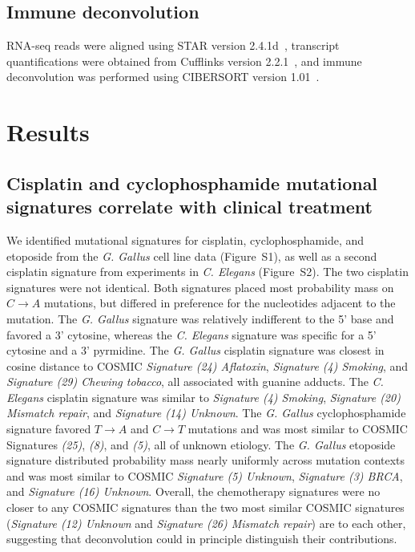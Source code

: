 \documentclass[linenumbers]{bmcart}
\begin{document}
\subsection*{Immune deconvolution}
RNA-seq reads were aligned using STAR version 2.4.1d~\cite{dobin2013}, transcript quantifications were obtained from Cufflinks version 2.2.1~\cite{trapnell2010}, and immune deconvolution was performed using CIBERSORT version 1.01~\cite{newman2015}. 


\section*{Results}

\subsection*{Cisplatin and cyclophosphamide mutational signatures correlate with clinical treatment}

We identified mutational signatures for cisplatin, cyclophosphamide, and etoposide from the \textit{G. Gallus} cell line data (Figure~S1), as well as a second cisplatin signature from experiments in \textit{C. Elegans} (Figure~S2). The two cisplatin signatures were not identical. Both signatures placed most probability mass on $C \rightarrow A$ mutations, but differed in preference for the nucleotides adjacent to the mutation. The \textit{G. Gallus} signature was relatively indifferent to the 5' base and favored a 3' cytosine, whereas the \textit{C. Elegans} signature was specific for a 5' cytosine and a 3' pyrmidine. The \textit{G. Gallus} cisplatin signature was closest in cosine distance to COSMIC \textit{Signature (24) Aflatoxin}, \textit{Signature (4) Smoking}, and \textit{Signature (29) Chewing tobacco}, all associated with guanine adducts. The \textit{C. Elegans} cisplatin signature was similar to \textit{Signature (4) Smoking}, \textit{Signature (20) Mismatch repair}, and \textit{Signature (14) Unknown}. The \textit{G. Gallus} cyclophosphamide signature favored $T \rightarrow A$ and $C \rightarrow T$ mutations and was most similar to COSMIC Signatures \textit{(25)}, \textit{(8)}, and \textit{(5)}, all of unknown etiology. The \textit{G. Gallus} etoposide signature distributed probability mass nearly uniformly across mutation contexts and was most similar to COSMIC \textit{Signature (5) Unknown}, \textit{Signature (3) BRCA}, and \textit{Signature (16) Unknown}. Overall, the chemotherapy signatures were no closer to any COSMIC signatures than the two most similar COSMIC signatures (\textit{Signature (12) Unknown} and \textit{Signature (26) Mismatch repair}) are to each other, suggesting that deconvolution could in principle distinguish their contributions.
\end{document}
